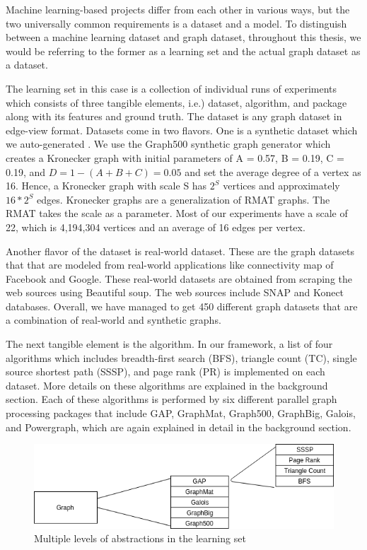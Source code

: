 Machine learning-based projects differ from each other in various ways, but the two universally common requirements is a dataset and a model. To distinguish between a machine learning dataset and graph dataset, throughout this thesis, we would be referring to the former as a learning set and the actual graph dataset as a dataset.

The learning set in this case is a collection of individual runs of experiments which consists of three tangible elements, i.e.) dataset, algorithm, and package along with its features and ground truth. The dataset is any graph dataset in edge-view format. Datasets come in two flavors. One is a synthetic dataset which we auto-generated . We use the Graph500 synthetic graph generator which creates a Kronecker graph with initial parameters of A = 0.57, B = 0.19, C = 0.19, and $D = 1 − (A + B + C) = 0.05$ and set the average degree of a vertex as 16. Hence, a Kronecker graph with scale S has $2^S$ vertices and approximately $16 * 2^S$ edges. Kronecker graphs are a generalization of RMAT graphs. The RMAT takes the scale as a parameter. Most of our experiments have a scale of 22, which is 4,194,304 vertices and an average of 16 edges per vertex. 

Another flavor of the dataset is real-world dataset. These are the graph datasets that that are modeled from real-world applications like connectivity map of Facebook and Google. These real-world datasets are obtained from scraping the web sources using Beautiful soup. The web sources include SNAP and Konect databases. Overall, we have managed to get 450 different graph datasets that are a combination of real-world and synthetic graphs.

The next tangible element is the algorithm. In our framework, a list of four algorithms which includes breadth-first search (BFS), triangle count (TC), single source shortest path (SSSP), and page rank (PR) is implemented on each dataset. More details on these algorithms are explained in the background section. Each of these algorithms is performed by six different parallel graph processing packages that include GAP, GraphMat, Graph500, GraphBig, Galois, and Powergraph, which are again explained in detail in the background section.

\begin{figure}
    \centering
    \includegraphics[width=1\columnwidth]{figures/dataset_flow.png}
    \caption{Multiple levels of abstractions in the learning set}
    \label{dataset_flow}
\end{figure}

